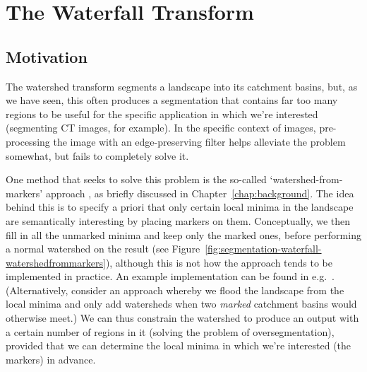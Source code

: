 \clearpage

\section{The Waterfall Transform}
\label{sec:segmentation-waterfall}

\subsection{Motivation}

The watershed transform segments a landscape into its catchment basins, but, as we have seen, this often produces a segmentation that contains far too many regions to be useful for the specific application in which we're interested (segmenting CT images, for example). In the specific context of images, pre-processing the image with an edge-preserving filter helps alleviate the problem somewhat, but fails to completely solve it.

One method that seeks to solve this problem is the so-called `watershed-from-markers' approach \cite{meyer90}, as briefly discussed in Chapter~\ref{chap:background}. The idea behind this is to specify a priori that only certain local minima in the landscape are semantically interesting by placing markers on them. Conceptually, we then fill in all the unmarked minima and keep only the marked ones, before performing a normal watershed on the result (see Figure~\ref{fig:segmentation-waterfall-watershedfrommarkers}), although this is not how the approach tends to be implemented in practice. An example implementation can be found in e.g.~\cite{felkel01}. (Alternatively, consider an approach whereby we flood the landscape from the local minima and only add watersheds when two \emph{marked} catchment basins would otherwise meet.) We can thus constrain the watershed to produce an output with a certain number of regions in it (solving the problem of oversegmentation), provided that we can determine the local minima in which we're interested (the markers) in advance.

